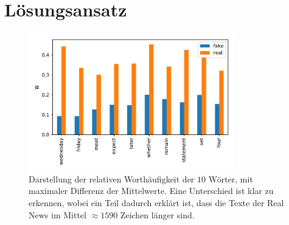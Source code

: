 \chapter{Lösungsansatz}
\label{sec:ansatz}

\begin{figure}
    \centering
    \includegraphics[width=0.8\textwidth]{pictures/data_visualisation.pdf}
    \caption{Darstellung der relativen Worthäufigkeit der $10$ Wörter, mit maximaler Differenz der Mittelwerte.
            Eine Unterschied ist klar zu erkennen, wobei ein Teil dadurch erklärt ist, dass die Texte der Real 
            News im Mittel $\approx 1590$ Zeichen länger sind.}
    \label{fig:word_plot}
\end{figure}


